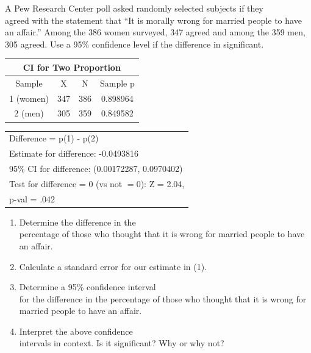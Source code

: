 \documentclass[11pt, chapterprefix=true]{scrbook}\usepackage[]{graphicx}\usepackage[]{color}
\begin{document}
\begin{exercises}
  \begin{exercise} %

A Pew Research Center poll asked randomly selected subjects if they \\ agreed with the statement that ``It is morally wrong for married people to have an affair.''  Among the 386 women surveyed, 347 agreed and among the 359 men, 305 agreed.  Use a 95\% confidence level if the difference in significant.


    {\small{
    \begin{tabular}{@{} cccc @{}} \hline %
       \multicolumn{4}{c}{CI for Two Proportion} \\ \hline
       Sample & X & N & Sample p \\ \hline
       1 (women) & 347 & 386 & 0.898964 \\
       2 (men) & 305 & 359 & 0.849582 \\ \hline
    \end{tabular}
    }}

    {\footnotesize{
    \begin{tabular}{@{} l @{}}
    Difference = p(1) - p(2) \\
    Estimate for difference: -0.0493816 \\
    95\% CI for difference: (0.00172287, 0.0970402)  \\
    Test for difference = 0 (vs not $= 0$): Z = 2.04,  \\ p-val = .042
    \end{tabular}
    }}

\begin{enumerate}
\item Determine the difference in the \\ percentage of those who thought that it is  wrong for married people to have an affair.

\item Calculate a standard error for our estimate in (1).

\item Determine a 95\% confidence interval \\ for the difference in the percentage of those who thought that it is wrong for married people to have an affair.

\item Interpret the above confidence \\ intervals in context.  Is it significant? Why or why not?


\end{enumerate}
\end{exercise}
\end{exercises}
\end{document}
